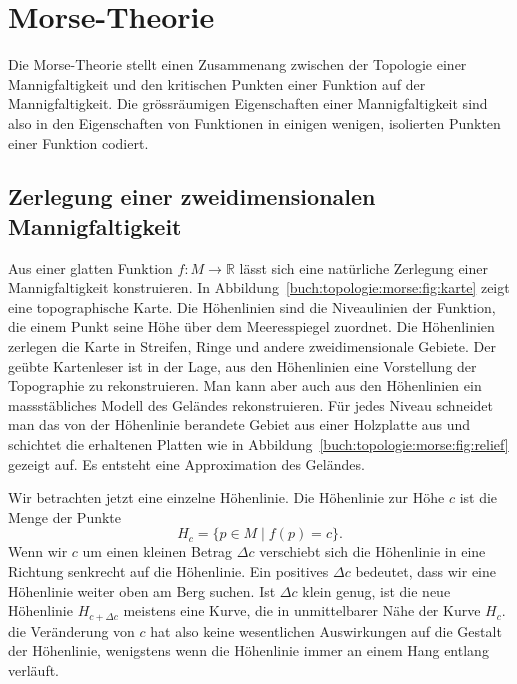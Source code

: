 %
%
\section{Morse-Theorie
\label{buch:topologie:section:morse}}
Die Morse-Theorie stellt einen Zusammenang zwischen der Topologie einer 
Mannigfaltigkeit und den kritischen Punkten einer Funktion auf der
Mannigfaltigkeit.
Die grössräumigen Eigenschaften einer Mannigfaltigkeit sind also
in den Eigenschaften von Funktionen in einigen wenigen, isolierten
Punkten einer Funktion codiert.

%
%
\subsection{Zerlegung einer zweidimensionalen Mannigfaltigkeit}
%
%
Aus einer glatten Funktion $f\colon M\to\mathbb{R}$ lässt
sich eine natürliche Zerlegung einer Mannigfaltigkeit konstruieren.
In Abbildung~\ref{buch:topologie:morse:fig:karte} zeigt eine 
topographische Karte.
Die Höhenlinien sind die Niveaulinien der Funktion, die einem
Punkt seine Höhe über dem Meeresspiegel zuordnet.
Die Höhenlinien zerlegen die Karte in Streifen, Ringe und andere
zweidimensionale Gebiete.
Der geübte Kartenleser ist in der Lage, aus den Höhenlinien eine
Vorstellung der Topographie zu rekonstruieren.
Man kann aber auch aus den Höhenlinien ein massstäbliches Modell
des Geländes rekonstruieren.
Für jedes Niveau schneidet man das von der Höhenlinie berandete Gebiet
aus einer Holzplatte aus und schichtet die erhaltenen Platten
wie in Abbildung~\ref{buch:topologie:morse:fig:relief} gezeigt
auf.
Es entsteht eine Approximation des Geländes.

Wir betrachten jetzt eine einzelne Höhenlinie.
Die Höhenlinie zur Höhe $c$ ist die Menge der Punkte
\[
H_c
=
\{ p\in M\mid f(p) = c \}.
\]
Wenn wir $c$ um einen kleinen Betrag $\Delta c$ verschiebt sich
die Höhenlinie in eine Richtung senkrecht auf die Höhenlinie.
Ein positives $\Delta c$ bedeutet, dass wir eine Höhenlinie weiter
oben am Berg suchen.
Ist $\Delta c$ klein genug, ist die neue Höhenlinie $H_{c+\Delta c}$
meistens eine Kurve, die in unmittelbarer Nähe der Kurve $H_c$.
die Veränderung von $c$ hat also keine wesentlichen Auswirkungen
auf die Gestalt der Höhenlinie, wenigstens wenn die Höhenlinie
immer an einem Hang entlang verläuft.

